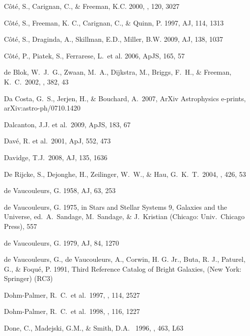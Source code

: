 \documentclass[12pt,preprint]{emulateapj}
\begin{document}
\begin{thebibliography}{}
C\^ot\'e, S., Carignan, C., \& Freeman, K.C. 2000, \aj , 120, 3027

C\^ot\'e, S., Freeman, K. C., Carignan, C., \& Quinn, P. 1997, AJ, 114, 1313

C\^ot\'e, S., Draginda, A., Skillman, E.D., Miller, B.W. 2009, AJ, 138, 1037

C\^ot\'e, P., Piatek, S., Ferrarese, L.~et al. 2006, ApJS, 165, 57

 de Blok, W.~J.~G., 
Zwaan, M.~A., Dijkstra, M., Briggs, F.~H., \& Freeman, K.~C.\ 2002, \aap, 
382, 43 

Da Costa, G.~S., Jerjen, H., \& Bouchard, A.\ 2007, ArXiv Astrophysics e-prints, arXiv:astro-ph/0710.1420

Dalcanton, J.J. et al.\ 2009, ApJS, 183, 67 

Dav\'e, R. et al.\ 2001, ApJ, 552, 473

Davidge, T.J.\ 2008, AJ, 135, 1636

De Rijcke, S., Dejonghe, H., Zeilinger, W.~W., \& Hau, G.~K.~T.\ 2004, \aap, 426, 53 

de Vaucouleurs, G. 1958, AJ, 63, 253

de Vaucouleurs, G. 1975, in Stars and Stellar Systems 9, Galaxies
and the Universe, ed.\ A.\ Sandage, M.\ Sandage, \& J.\ Kristian
(Chicago: Univ.\ Chicago Press), 557

de Vaucouleurs, G. 1979, AJ, 84, 1270

de Vaucouleurs, G., de Vaucouleurs, A., Corwin, H. G. Jr.,
Buta, R. J., Paturel, G., \& Foqu\'e, P. 1991, Third Reference
Catalog of Bright Galaxies, (New York: Springer) (RC3)

Dohm-Palmer, R.~C.~et al.\ 1997, \aj, 114, 2527 

Dohm-Palmer, R.~C.~et al.\ 1998, \aj, 116, 1227 

Done, C., Madejski, G.M., \& Smith, D.A. \ 1996, \apj, 463, L63 


\end{thebibliography}
\end{document}
